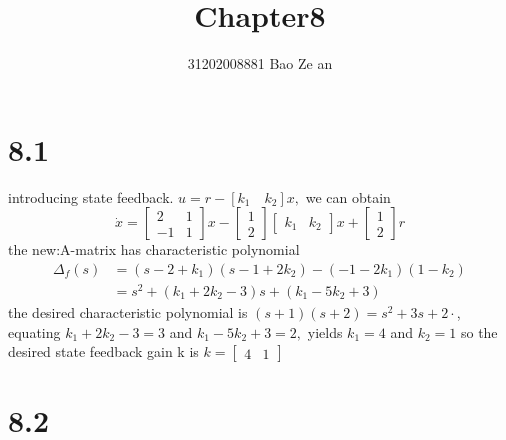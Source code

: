 \documentclass{article}
\title{Chapter8}
\author{31202008881        \quad \quad \quad
          Bao Ze an}
\begin{document}
\setlength{\parindent}{0em}
\maketitle
\section*{8.1}
introducing state feedback. $u=r-\left[k_{1} \quad k_{2}\right]x,$ we can obtain
$$
\dot{x}=\left[\begin{array}{cc}
2 & 1 \\
-1 & 1
\end{array}\right] x-\left[\begin{array}{l}
1 \\
2
\end{array}\right]\left[\begin{array}{ll}
k_{1} & k_{2}
\end{array}\right] x+\left[\begin{array}{l}
1 \\
2
\end{array}\right] r
$$
the new:A-matrix has characteristic polynomial
$$
\begin{aligned}
\Delta_{f}(s) &=\left(s-2+k_{1}\right)\left(s-1+2 k_{2}\right)-\left(-1-2 k_{1}\right)\left(1-k_{2}\right) \\
&=s^{2}+\left(k_{1}+2 k_{2}-3\right) s+\left(k_{1}-5 k_{2}+3\right)
\end{aligned}
$$
the desired characteristic polynomial is $(s+1)(s+2)=s^{2}+3 s+2 \cdot$, equating
$k_{1}+2 k_{2}-3=3$ and $k_{1}-5 k_{2}+3=2,$ yields
$k_{1}=4$ and $k_{2}=1$ so the desired state feedback gain k is $k=\left[\begin{array}{ll}4 & 1\end{array}\right]$

\section*{8.2}
\end{document}
